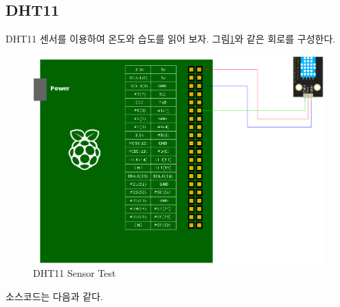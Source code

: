 \documentclass[11pt
  , a4paper
  , article
  , oneside
]{memoir}
\begin{document}
\subsection{DHT11}\label{subsec:dht11App}
DHT11 센서를 이용하여 온도와 습도를 읽어 보자. 그림\ref{fig:dht11_test}와 같은 회로를 구성한다.
\begin{figure}[!htb]
\centering
\includegraphics[width=1\textwidth]{./images/raspberry/dht11test.png}
\caption{DHT11 Sensor Test}
\label{fig:dht11_test}
\end{figure}
소스코드는 다음과 같다.
\end{document}
